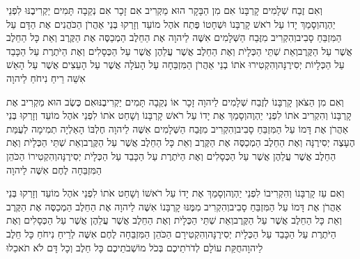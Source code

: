 \documentclass[../main/main.tex]{subfiles}
\begin{document}
\begin{multicols*}{\ncols}
וְאִם זֶבַח שְׁלָמִים קָרְבָּנוֹ אִם מִן הַבָּקָר הוּא מַקְרִיב אִם זָכָר אִם נְקֵבָה תָּמִים יַקְרִיבֶנּוּ לִפְנֵי יַהְוֶה\PreVerseSpace{}וְסָמַךְ יָדוֹ עַל רֹאשׁ קָרְבָּנוֹ וּשְׁחָטוֹ פֶּתַח אֹהֶל מוֹעֵד וְזָרְקוּ בְּנֵי אַהֲרֹן הַכֹּהֲנִים אֶת הַדָּם עַל הַמִּזְבֵּחַ סָבִיב\PreVerseSpace{}וְהִקְרִיב מִזֶּבַח הַשְּׁלָמִים אִשֶּׁה לַיהוָה אֶת הַחֵלֶב הַמְכַסֶּה אֶת הַקֶּרֶב וְאֵת כָּל הַחֵלֶב אֲשֶׁר עַל הַקֶּרֶב\PreVerseSpace{}וְאֵת שְׁתֵּי הַכְּלָיֹת וְאֶת הַחֵלֶב אֲשֶׁר עֲלֵהֶן אֲשֶׁר עַל הַכְּסָלִים וְאֶת הַיֹּתֶרֶת עַל הַכָּבֵד עַל הַכְּלָיוֹת יְסִירֶנָּה\PreVerseSpace{}וְהִקְטִירוּ אֹתוֹ בְנֵי אַהֲרֹן הַמִּזְבֵּחָה עַל הָעֹלָה אֲשֶׁר עַל הָעֵצִים אֲשֶׁר עַל הָאֵשׁ אִשֵּׁה רֵיחַ נִיחֹחַ לַיהוָה\OpenSection{}\par
{}וְאִם מִן הַצֹּאן קָרְבָּנוֹ לְזֶבַח שְׁלָמִים לַיהוָה זָכָר אוֹ נְקֵבָה תָּמִים יַקְרִיבֶנּוּ\PreVerseSpace{}אִם כֶּשֶׂב הוּא מַקְרִיב אֶת קָרְבָּנוֹ וְהִקְרִיב אֹתוֹ לִפְנֵי יַהְוֶה\PreVerseSpace{}וְסָמַךְ אֶת יָדוֹ עַל רֹאשׁ קָרְבָּנוֹ וְשָׁחַט אֹתוֹ לִפְנֵי אֹהֶל מוֹעֵד וְזָרְקוּ בְּנֵי אַהֲרֹן אֶת דָּמוֹ עַל הַמִּזְבֵּחַ סָבִיב\PreVerseSpace{}וְהִקְרִיב מִזֶּבַח הַשְּׁלָמִים אִשֶּׁה לַיהוָה חֶלְבּוֹ הָאַלְיָה תְמִימָה לְעֻמַּת הֶעָצֶה יְסִירֶנָּה וְאֶת הַחֵלֶב הַמְכַסֶּה אֶת הַקֶּרֶב וְאֵת כָּל הַחֵלֶב אֲשֶׁר עַל הַקֶּרֶב\PreVerseSpace{}וְאֵת שְׁתֵּי הַכְּלָיֹת וְאֶת הַחֵלֶב אֲשֶׁר עֲלֵהֶן אֲשֶׁר עַל הַכְּסָלִים וְאֶת הַיֹּתֶרֶת עַל הַכָּבֵד עַל הַכְּלָיֹת יְסִירֶנָּה\PreVerseSpace{}וְהִקְטִירוֹ הַכֹּהֵן הַמִּזְבֵּחָה לֶחֶם אִשֶּׁה לַיהוָה\OpenSection{}\par
{}וְאִם עֵז קָרְבָּנוֹ וְהִקְרִיבוֹ לִפְנֵי יַהְוֶה\PreVerseSpace{}וְסָמַךְ אֶת יָדוֹ עַל רֹאשׁוֹ וְשָׁחַט אֹתוֹ לִפְנֵי אֹהֶל מוֹעֵד וְזָרְקוּ בְּנֵי אַהֲרֹן אֶת דָּמוֹ עַל הַמִּזְבֵּחַ סָבִיב\PreVerseSpace{}וְהִקְרִיב מִמֶּנּוּ קָרְבָּנוֹ אִשֶּׁה לַיהוָה אֶת הַחֵלֶב הַמְכַסֶּה אֶת הַקֶּרֶב וְאֵת כָּל הַחֵלֶב אֲשֶׁר עַל הַקֶּרֶב\PreVerseSpace{}וְאֵת שְׁתֵּי הַכְּלָיֹת וְאֶת הַחֵלֶב אֲשֶׁר עֲלֵהֶן אֲשֶׁר עַל הַכְּסָלִים וְאֶת הַיֹּתֶרֶת עַל הַכָּבֵד עַל הַכְּלָיֹת יְסִירֶנָּה\PreVerseSpace{}וְהִקְטִירָם הַכֹּהֵן הַמִּזְבֵּחָה לֶחֶם אִשֶּׁה לְרֵיחַ נִיחֹחַ כָּל חֵלֶב לַיהוָה\PreVerseSpace{}חֻקַּת עוֹלָם לְדֹרֹתֵיכֶם בְּכֹל מוֹשְׁבֹתֵיכֶם כָּל חֵלֶב וְכָל דָּם לֹא תֹאכֵלוּ\OpenSection{}\par

\end{multicols*}
\end{document}
